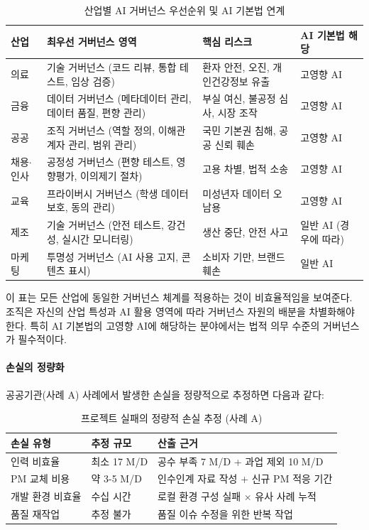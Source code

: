 \begin{table}[htbp]
\centering
\caption{산업별 AI 거버넌스 우선순위 및 AI 기본법 연계}
\label{tab:industry_governance_priority}
\begin{tabularx}{\textwidth}{|l|X|X|l|}
\hline
\textbf{산업} & \textbf{최우선 거버넌스 영역} & \textbf{핵심 리스크} & \textbf{AI 기본법 해당} \\ \hline
의료 & 기술 거버넌스 (코드 리뷰, 통합 테스트, 임상 검증) & 환자 안전, 오진, 개인건강정보 유출 & 고영향 AI \\ \hline
금융 & 데이터 거버넌스 (메타데이터 관리, 데이터 품질, 편향 관리) & 부실 여신, 불공정 심사, 시장 조작 & 고영향 AI \\ \hline
공공 & 조직 거버넌스 (역할 정의, 이해관계자 관리, 범위 관리) & 국민 기본권 침해, 공공 신뢰 훼손 & 고영향 AI \\ \hline
채용$\cdot$인사 & 공정성 거버넌스 (편향 테스트, 영향평가, 이의제기 절차) & 고용 차별, 법적 소송 & 고영향 AI \\ \hline
교육 & 프라이버시 거버넌스 (학생 데이터 보호, 동의 관리) & 미성년자 데이터 오남용 & 고영향 AI \\ \hline
제조 & 기술 거버넌스 (안전 테스트, 강건성, 실시간 모니터링) & 생산 중단, 안전 사고 & 일반 AI (경우에 따라) \\ \hline
마케팅 & 투명성 거버넌스 (AI 사용 고지, 콘텐츠 표시) & 소비자 기만, 브랜드 훼손 & 일반 AI \\ \hline
\end{tabularx}
\end{table}

이 표는 모든 산업에 동일한 거버넌스 체계를 적용하는 것이 비효율적임을 보여준다. 조직은 자신의 산업 특성과 AI 활용 영역에 따라 거버넌스 자원의 배분을 차별화해야 한다. 특히 AI 기본법의 고영향 AI에 해당하는 분야에서는 법적 의무 수준의 거버넌스가 필수적이다.

\paragraph{손실의 정량화}
공공기관(사례 A) 사례에서 발생한 손실을 정량적으로 추정하면 다음과 같다:

\begin{table}[htbp]
\centering
\caption{프로젝트 실패의 정량적 손실 추정 (사례 A)}
\label{tab:quantitative_loss}
\begin{tabularx}{\textwidth}{|l|l|X|}
\hline
\textbf{손실 유형} & \textbf{추정 규모} & \textbf{산출 근거} \\ \hline
인력 비효율 & 최소 17 M/D & 공수 부족 7 M/D + 과업 제외 10 M/D \\ \hline
PM 교체 비용 & 약 3-5 M/D & 인수인계 자료 작성 + 신규 PM 적응 기간 \\ \hline
개발 환경 비효율 & 수십 시간 & 로컬 환경 구성 실패 $\times$ 유사 사례 누적 \\ \hline
품질 재작업 & 추정 불가 & 품질 이슈 수정을 위한 반복 작업 \\ \hline
\end{tabularx}
\end{table}

